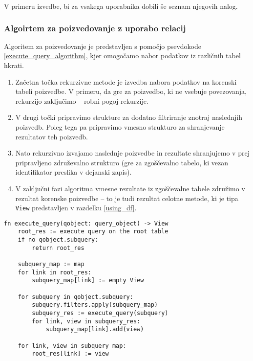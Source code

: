 \documentclass[a4paper,12pt,openright]{book}
\begin{document}
\begin{itemize}
        \noindent
        V primeru izvedbe, bi za vsakega uporabnika dobili še seznam njegovih nalog.

        \subsubsection{Algoirtem za poizvedovanje z uporabo relacij}
        \label{query_execution}

        Algoritem za poizvedovanje je predstavljen s pomočjo psevdokode \ref{execute_query_algorithm}, kjer omogočamo nabor podatkov iz različnih tabel hkrati.

        \begin{enumerate}
            \item Začetna točka rekurzivne metode je izvedba nabora podatkov na korenski tabeli poizvedbe. V primeru, da gre za poizvedbo, ki ne vsebuje povezovanja, rekurzijo zaključimo – robni pogoj rekurzije.
            \item V drugi točki pripravimo strukture za dodatno filtriranje znotraj naslednjih poizvedb. Poleg tega pa pripravimo vmesno strukturo za shranjevanje rezultatov teh poizvedb.
            \item Nato rekurzivno izvajamo naslednje poizvedbe in rezultate shranjujemo v prej pripravljeno združevalno strukturo (gre za zgošče\-valno tabelo, ki vezan identifikator preslika v dejanski zapis).
            \item V zaključni fazi algoritma vmesne rezultate iz zgoščevalne tabele združimo v rezultat korenske poizvedbe – to je tudi rezultat celotne metode, ki je tipa {\tt View} predstavljen v razdelku \ref{using_df}.
        \end{enumerate}

\begin{code}
\begin{verbatim}
fn execute_query(qobject: query_object) -> View
    root_res := execute query on the root table
    if no qobject.subquery:
        return root_res

    subquery_map := map
    for link in root_res:
        subquery_map[link] := empty View

    for subquery in qobject.subquery:
        subquery.filters.apply(subquery_map)
        subquery_res := execute_query(subquery)
        for link, view in subquery_res:
            subquery_map[link].add(view)

    for link, view in subquery_map:
        root_res[link] := view


\end{verbatim}
\end{code}
\end{itemize}
\end{document}
